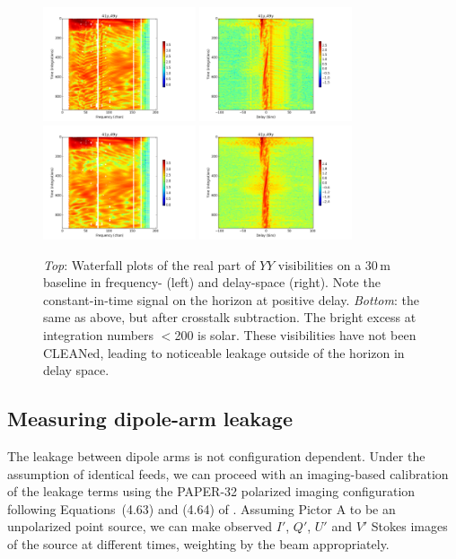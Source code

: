 \documentclass[10pt,a4paper,notitlepage]{article}
\begin{document}
\begin{figure}
\centering
\includegraphics[width=0.4\textwidth]{6250_C.png}
\includegraphics[width=0.4\textwidth]{6250_C_d.png}
\includegraphics[width=0.4\textwidth]{6250_Cx.png}
\includegraphics[width=0.4\textwidth]{6250_Cx_d.png}
\caption{\textit{Top}: Waterfall plots of the real part of $YY$ visibilities on a 30\,m baseline in frequency- (left) and delay-space (right). Note the constant-in-time signal on the horizon at positive delay. \textit{Bottom}: the same as above, but after crosstalk subtraction. The bright excess at integration numbers $<$200 is solar. These visibilities have not been CLEANed, leading to noticeable leakage outside of the horizon in delay space.}
\label{fig:waterfalls}
\end{figure}

\subsection{Measuring dipole-arm leakage}
\label{subsec:method_dterms}
The leakage between dipole arms is not configuration dependent. Under the assumption of identical feeds, we can proceed with an imaging-based calibration of the leakage terms using the PAPER-32 polarized imaging configuration following Equations~(4.63) and (4.64) of \cite{TMS}. Assuming Pictor A to be an unpolarized point source, we can make observed $I'$, $Q'$, $U'$ and $V'$ Stokes images of the source at different times, weighting by the beam appropriately.  \\
\end{document}

